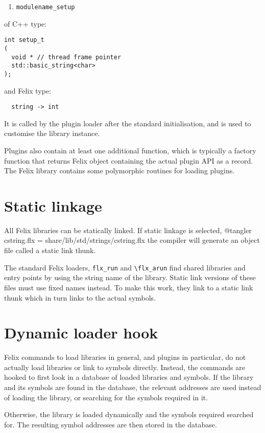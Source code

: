 \documentclass[oneside]{book}
\begin{document}
\begin{enumerate}
\item \verb$modulename_setup$
\end{enumerate}

of C++ type:

\begin{verbatim}
int setup_t
(
  void * // thread frame pointer
  std::basic_string<char>
);
\end{verbatim}

and Felix type:

\begin{verbatim}
  string -> int
\end{verbatim}

It is called by the plugin loader after the standard initialisation,
and is used to customise the library instance.

Plugins also contain at least one additional function, which is typically a factory
function that returns Felix object containing the actual plugin API
as a record. The Felix library contains some polymorphic routines
for loading plugins.

\section{Static linkage}
All Felix libraries can be statically linked. If static linkage is selected,
@tangler cstring.flx = share/lib/std/strings/cstring.flx
the compiler will generate an object file called a static link thunk.

The standard Felix loaders, \verb$flx_run$ and \verb$\flx_arun$ find shared
libraries and entry points by using the string name of the library.
Static link versions of these files must use fixed names instead.
To make this work, they link to a static link thunk which in turn
links to the actual symbols.

\section{Dynamic loader hook}
Felix commands to load libraries in general, and plugins in
particular, do not actually load libraries or link to symbols
directly. Instead, the commands are hooked to first look in
a database of loaded libraries and symbols. If the library and
its symbols are found in the database, the relevant addresses
are used instead of loading the library, or searching for the
symbols required in it.

Otherwise, the library is loaded dynamically and the symbols
required searched for. The resulting symbol addresses are
then stored in the database.
\end{document}

